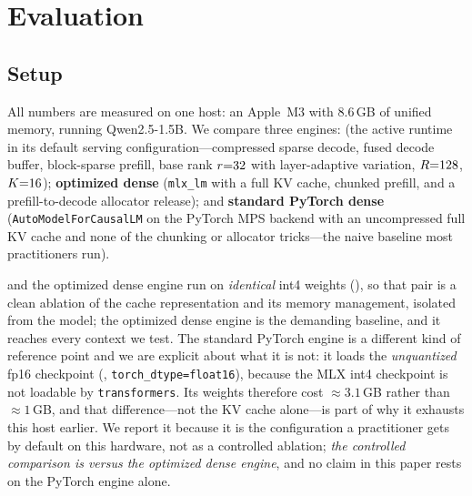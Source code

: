 \section{Evaluation}
\label{sec:eval}

\subsection{Setup}
All numbers are measured on one host: an Apple~M3 with $8.6$\,GB of unified memory, running
Qwen2.5-1.5B. We compare three engines: \textbf{\dkv{}} (the active runtime in its default serving
configuration---compressed sparse decode, fused decode buffer, block-sparse prefill, base rank
$r{=}32$ with layer-adaptive variation, $R{=}128$, $K{=}16$); \textbf{optimized dense}
(\texttt{mlx\_lm} with a full KV cache, chunked prefill, and a prefill-to-decode allocator
release); and \textbf{standard PyTorch dense} (\texttt{AutoModelForCausalLM} on the PyTorch MPS
backend with an uncompressed full KV cache and none of the chunking or allocator tricks---the naive
baseline most practitioners run).

\dkv{} and the optimized dense engine run on \emph{identical} int4 weights
(), so that pair is a clean ablation of the cache
representation and its memory management, isolated from the model; the optimized dense engine is
the demanding baseline, and it reaches every context we test. The standard PyTorch engine is a
different kind of reference point and we are explicit about what it is not: it loads the
\emph{unquantized} fp16 checkpoint (, \texttt{torch\_dtype=float16}),
because the MLX int4 checkpoint is not loadable by \texttt{transformers}. Its weights therefore cost
$\approx3.1$\,GB rather than $\approx1$\,GB, and that difference---not the KV cache alone---is part of
why it exhausts this host earlier. We report it because it is the configuration a practitioner gets by
default on this hardware, not as a controlled ablation; \emph{the controlled comparison is \dkv{}
versus the optimized dense engine}, and no claim in this paper rests on the PyTorch engine alone.

